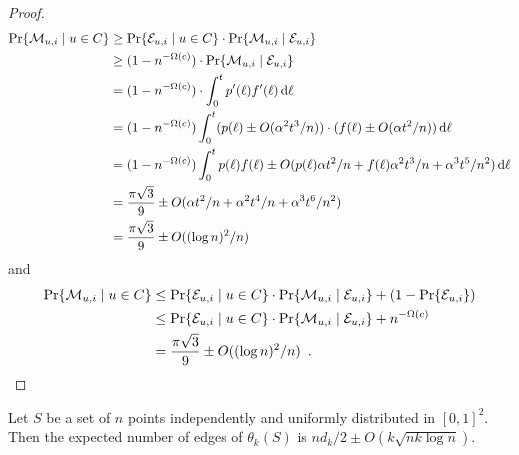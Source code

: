 \documentclass{patmorin}
\begin{document}
\begin{proof}
\begin{align*}
    \Pr\{\mathcal{M}_{u,i} \mid u\in C\} 
         & \ge \Pr\{\mathcal{E}_{u,i}\mid u\in C\}\cdot \Pr\{\mathcal{M}_{u,i}\mid \mathcal{E}_{u,i}\} \\
         & \ge (1-n^{-\Omega(c)})\cdot \Pr\{\mathcal{M}_{u,i}\mid \mathcal{E}_{u,i}\} \\
         & = (1-n^{-\Omega(c)})\cdot\int_0^t p'(\ell)f'(\ell)\,\mathrm{d}\ell \\
         & = (1-n^{-\Omega(c)})\int_0^t (p(\ell)\pm O(\alpha^2t^3/n))\cdot(f(\ell)\pm O(\alpha t^2/n))\,\mathrm{d}{\ell} \\
         & = (1-n^{-\Omega(c)})\int_0^t p(\ell)f(\ell)
           \pm O(p(\ell)\alpha t^2/n + f(\ell)\alpha^2t^3/n + \alpha^3t^5/n^2)
            \,\mathrm{d}{\ell} \\
        & = \frac{\pi\sqrt{3}}{9} \pm O(\alpha t^2/n + \alpha^2t^4/n + \alpha^3t^6/n^2) \\
        & =  \frac{\pi\sqrt{3}}{9} \pm O((\log n)^2/n)
\end{align*}
and
\begin{align*}
    \Pr\{\mathcal{M}_{u,i} \mid u\in C\} 
       & \le \Pr\{\mathcal{E}_{u,i}\mid u\in C\}\cdot \Pr\{\mathcal{M}_{u,i}\mid \mathcal{E}_{u,i}\}
           + (1-\Pr\{\mathcal{E}_{u,i}\}) \\
       & \le \Pr\{\mathcal{E}_{u,i}\mid u\in C\}\cdot \Pr\{\mathcal{M}_{u,i}\mid \mathcal{E}_{u,i}\} 
           + n^{-\Omega(c)} \\
         & = \frac{\pi\sqrt{3}}{9} \pm O((\log n)^2/n) \enspace . \qedhere
\end{align*} 
\end{proof}

\begin{lem}
 Let $S$ be a set of $n$ points independently and uniformly distributed
 in $[0,1]^2$.  Then the expected number of edges of $\theta_k(S)$ is 
 $nd_k/2\pm O(k\sqrt{nk\log n})$.
\end{lem}
\end{document}

